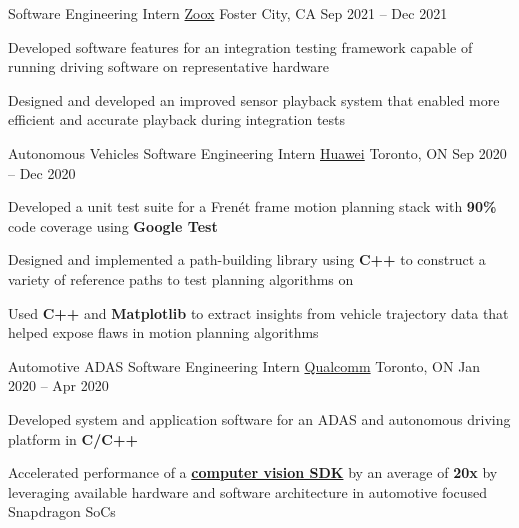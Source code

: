 \documentclass[]{awesome-cv}
\begin{document}
\begin{cventries}
	\cventry
	{Software Engineering Intern}
	{\href{https://zoox.com/}{Zoox}}
	{Foster City, CA}
	{Sep 2021 – Dec 2021}
	{\begin{cvitems}
	    \item Developed software features for an integration testing framework capable of running driving software on representative hardware
	    \item Designed and developed an improved sensor playback system that enabled more efficient and accurate playback during integration tests
	\end{cvitems}}
	\cventry
	{Autonomous Vehicles Software Engineering Intern}
	{\href{https://www.huawei.com/ca/}{Huawei}}
	{Toronto, ON}
	{Sep 2020 – Dec 2020}
	{\begin{cvitems}
		\item {Developed a unit test suite for a Frenét frame motion planning stack with \textbf{90\%} code coverage using \textbf{Google Test}}
		\item {Designed and implemented a path-building library using \textbf{C++} to construct a variety of reference paths to test planning algorithms on}
		\item {Used \textbf{C++} and \textbf{Matplotlib} to extract insights from vehicle trajectory data that helped expose flaws in motion planning algorithms}
	\end{cvitems}}
	\cventry
	{Automotive ADAS Software Engineering Intern}
	{\href{https://www.qualcomm.com/}{Qualcomm}}
	{Toronto, ON}
	{Jan 2020 – Apr 2020}
	{\begin{cvitems}
		\item {Developed system and application software for an ADAS and autonomous driving platform in \textbf{C/C++}}
		\item {Accelerated performance of a \href{https://developer.qualcomm.com/software/fastcv-sdk}{\textbf{computer vision SDK}} by an average of \textbf{20x} by leveraging available hardware and software architecture in automotive focused Snapdragon SoCs}

\end{cvitems}}
\end{cventries}
\end{document}
